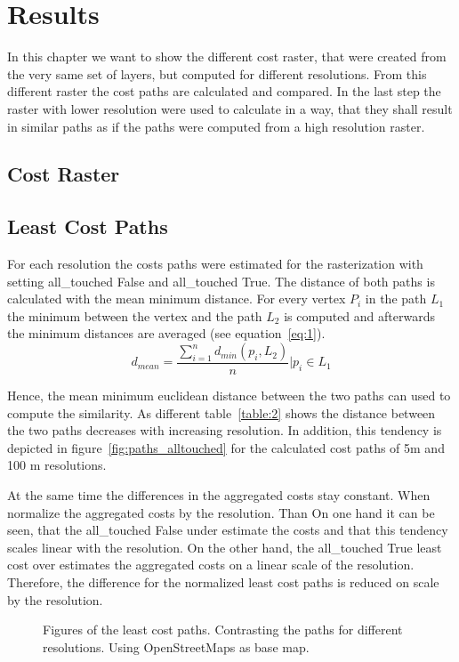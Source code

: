 \documentclass[acmtog]{acmart}
\begin{document}
	\section{Results}
	In this chapter we want to show the different cost raster, that were created from the very same set of layers,
	but computed for different resolutions.
	From this different raster the cost paths are calculated and compared.
	In the last step the raster with lower resolution were used to calculate in a way, that they shall result in
	similar paths as if the paths were computed from a high resolution raster.
	\subsection{Cost Raster}
	\subsection{Least Cost Paths}
	For each resolution the costs paths were estimated for the rasterization with setting all\_touched False
	and all\_touched True.
	The distance of both paths is calculated with the mean minimum distance.
	For every vertex $P_i$ in the path $L_1$ the minimum between the vertex and the path $L_2$
	is computed and afterwards the minimum distances are averaged (see equation~\ref{eq:1}).
	\begin{equation}
		\label{eq:1}
		d_{mean} = \frac{\sum_{i=1}^{n} d_{min}(p_i, L_2)}{n} \bigg\vert p_i \in L_1
	\end{equation}

	Hence, the mean minimum euclidean distance between the two paths can used to compute
	the similarity.
	As different table~\ref{table:2} shows the distance between the two paths decreases
	with increasing resolution. In addition, this tendency is depicted in figure~\ref{fig:paths_alltouched} for the calculated cost paths of 5m and 100 m resolutions.
	
	At the same time the differences in the aggregated costs stay constant.
	 When normalize the aggregated costs by the resolution.
	Than On one hand it can be seen, that the all\_touched False under estimate the costs and that this tendency scales
	linear with the resolution.
	On the other hand, the all\_touched True least cost over estimates the aggregated costs on a linear scale of
	the resolution.
	Therefore, the difference for the normalized least cost paths is reduced on scale by the resolution.
	
	\begin{figure}
		\centering
		
		\qquad
		\caption{Figures of the least cost paths. Contrasting the paths for different resolutions. Using OpenStreetMaps as base map.}
		\label{fig:paths_resolution}
	\end{figure}
\end{document}
